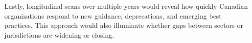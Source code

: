 \documentclass[pdflatex,sn-mathphys-num]{sn-jnl}
\numberwithin{equation}{section}
\theoremstyle{thmstyleone}
\theoremstyle{thmstyletwo}%
\theoremstyle{thmstylethree}%
\begin{document}
\vspace{1em}Lastly, longitudinal scans over multiple years would reveal how quickly Canadian organizations 
respond to new guidance, deprecations, and emerging best practices. This approach would also illuminate 
whether gaps between sectors or jurisdictions are widening or closing. 





\end{document}
